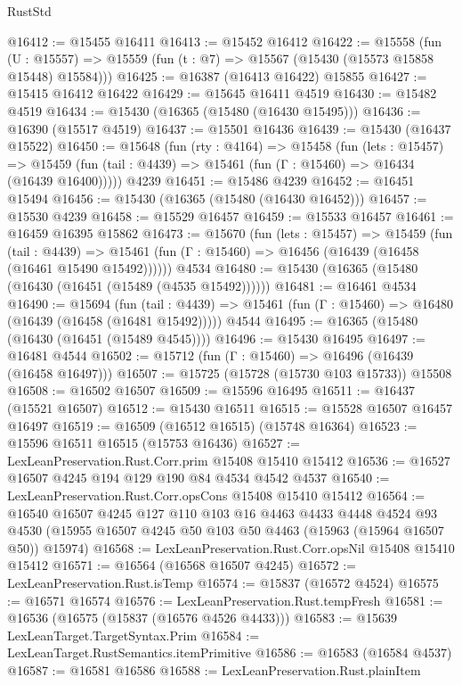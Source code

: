 \begin{lexlean}{RustStd}
\begin{coremodule}
@16412 := @15455 @16411
@16413 := @15452 @16412
@16422 := @15558
    (fun (U : @15557) => @15559 (fun (t : @7) => @15567 (@15430 (@15573 @15858 @15448) @15584)))
@16425 := @16387 (@16413 @16422) @15855
@16427 := @15415 @16412 @16422
@16429 := @15645 @16411 @4519
@16430 := @15482 @4519
@16434 := @15430 (@16365 (@15480 (@16430 @15495)))
@16436 := @16390 (@15517 @4519)
@16437 := @15501 @16436
@16439 := @15430 (@16437 @15522)
@16450 := @15648
    (fun (rty : @4164) =>
    @15458
      (fun (lets : @15457) =>
      @15459 (fun (tail : @4439) => @15461 (fun (Γ : @15460) => @16434 (@16439 @16400)))))
    @4239
@16451 := @15486 @4239
@16452 := @16451 @15494
@16456 := @15430 (@16365 (@15480 (@16430 @16452)))
@16457 := @15530 @4239
@16458 := @15529 @16457
@16459 := @15533 @16457
@16461 := @16459 @16395 @15862
@16473 := @15670
    (fun (lets : @15457) =>
    @15459
      (fun (tail : @4439) =>
      @15461 (fun (Γ : @15460) => @16456 (@16439 (@16458 (@16461 @15490 @15492))))))
    @4534
@16480 := @15430 (@16365 (@15480 (@16430 (@16451 (@15489 (@4535 @15492))))))
@16481 := @16461 @4534
@16490 := @15694
    (fun (tail : @4439) => @15461 (fun (Γ : @15460) => @16480 (@16439 (@16458 (@16481 @15492)))))
    @4544
@16495 := @16365 (@15480 (@16430 (@16451 (@15489 @4545))))
@16496 := @15430 @16495
@16497 := @16481 @4544
@16502 := @15712 (fun (Γ : @15460) => @16496 (@16439 (@16458 @16497)))
@16507 := @15725 (@15728 (@15730 @103 @15733)) @15508
@16508 := @16502 @16507
@16509 := @15596 @16495
@16511 := @16437 (@15521 @16507)
@16512 := @15430 @16511
@16515 := @15528 @16507 @16457 @16497
@16519 := @16509 (@16512 @16515) (@15748 @16364)
@16523 := @15596 @16511 @16515 (@15753 @16436)
@16527 := LexLeanPreservation.Rust.Corr.prim @15408 @15410 @15412
@16536 := @16527 @16507 @4245 @194 @129 @190 @84 @4534 @4542 @4537
@16540 := LexLeanPreservation.Rust.Corr.opsCons @15408 @15410 @15412
@16564 := @16540
    @16507
    @4245
    @127
    @110
    @103
    @16
    @4463
    @4433
    @4448
    @4524
    @93
    @4530
    (@15955 @16507 @4245 @50 @103 @50 @4463 (@15963 (@15964 @16507 @50)) @15974)
@16568 := LexLeanPreservation.Rust.Corr.opsNil @15408 @15410 @15412
@16571 := @16564 (@16568 @16507 @4245)
@16572 := LexLeanPreservation.Rust.isTemp
@16574 := @15837 (@16572 @4524)
@16575 := @16571 @16574
@16576 := LexLeanPreservation.Rust.tempFresh
@16581 := @16536 (@16575 (@15837 (@16576 @4526 @4433)))
@16583 := @15639 LexLeanTarget.TargetSyntax.Prim
@16584 := LexLeanTarget.RustSemantics.itemPrimitive
@16586 := @16583 (@16584 @4537)
@16587 := @16581 @16586
@16588 := LexLeanPreservation.Rust.plainItem

\end{coremodule}
\end{lexlean}

